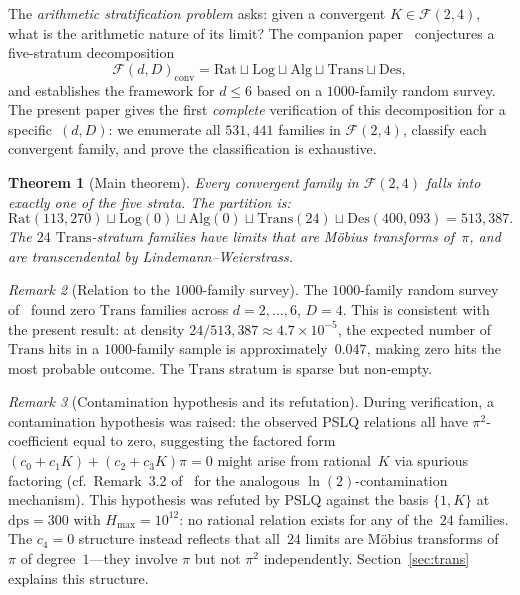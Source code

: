 \documentclass{amsart}
\newtheorem{theorem}{Theorem}[section]
\theoremstyle{definition}
\theoremstyle{remark}
\newtheorem{remark}[theorem]{Remark}
\newcommand{\FF}{\mathcal{F}}
\newcommand{\Rat}{\mathrm{Rat}}
\newcommand{\Log}{\mathrm{Log}}
\newcommand{\Alg}{\mathrm{Alg}}
\newcommand{\Trans}{\mathrm{Trans}}
\newcommand{\Des}{\mathrm{Des}}
\newcommand{\dps}{\mathrm{dps}}
\begin{document}
The \emph{arithmetic stratification problem} asks: given a convergent
$K \in \FF(2,4)$, what is the arithmetic nature of its limit?  The
companion paper~\cite{synthesis} conjectures a five-stratum decomposition
\[
  \FF(d,D)_{\mathrm{conv}} = \Rat \sqcup \Log \sqcup \Alg \sqcup \Trans
  \sqcup \Des,
\]
and establishes the framework for $d \le 6$ based on a $1000$-family
random survey.  The present paper gives the first \emph{complete}
verification of this decomposition for a specific~$(d,D)$: we enumerate
all $531{,}441$ families in $\FF(2,4)$, classify each convergent family,
and prove the classification is exhaustive.

\begin{theorem}[Main theorem]\label{thm:main}
Every convergent family in $\FF(2,4)$ falls into exactly one of the five
strata.  The partition is:
\[
  \Rat(113{,}270) \sqcup \Log(0) \sqcup \Alg(0) \sqcup \Trans(24) \sqcup
  \Des(400{,}093) = 513{,}387.
\]
The $24$ $\Trans$-stratum families have limits that are M\"obius
transforms of~$\pi$, and are transcendental by Lindemann--Weierstrass.
\end{theorem}

\begin{remark}[Relation to the $1000$-family survey]\label{rem:survey}
The $1000$-family random survey of~\cite{synthesis} found zero
$\Trans$ families across $d = 2, \dotsc, 6$, $D=4$.  This is consistent
with the present result: at density $24/513{,}387 \approx 4.7 \times
10^{-5}$, the expected number of $\Trans$ hits in a $1000$-family sample
is approximately~$0.047$, making zero hits the most probable outcome.
The $\Trans$ stratum is sparse but non-empty.
\end{remark}

\begin{remark}[Contamination hypothesis and its refutation]\label{rem:contam}
During verification, a contamination hypothesis was raised: the observed
PSLQ relations all have $\pi^2$-coefficient equal to zero, suggesting the
factored form
$(c_0 + c_1 K) + (c_2 + c_3 K)\pi = 0$
might arise from rational~$K$ via spurious factoring (cf.\ Remark~3.2
of~\cite{contamination} for the analogous $\ln(2)$-contamination
mechanism).  This hypothesis was refuted by PSLQ against the basis
$\{1, K\}$ at $\dps = 300$ with $H_{\max} = 10^{12}$: no rational
relation exists for any of the~$24$ families.  The $c_4 = 0$ structure
instead reflects that all~$24$ limits are M\"obius transforms of~$\pi$ of
degree~$1$---they involve $\pi$ but not $\pi^2$ independently.
Section~\ref{sec:trans} explains this structure.
\end{remark}
\end{document}
